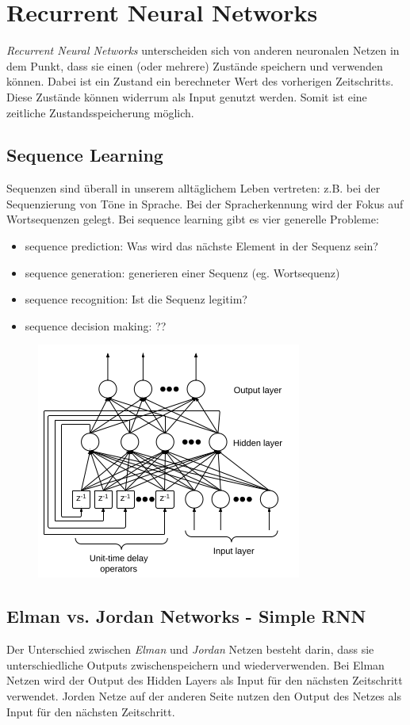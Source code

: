 \section{Recurrent Neural Networks}
\label{sect:recurrent-neural-networks}
\textit{Recurrent Neural Networks} unterscheiden sich von anderen neuronalen Netzen in dem Punkt, dass sie einen (oder mehrere) Zustände speichern und verwenden können. Dabei ist ein Zustand ein berechneter Wert des vorherigen Zeitschritts. Diese Zustände können widerrum als Input genutzt werden. Somit ist eine zeitliche Zustandsspeicherung möglich.

\subsection{Sequence Learning}
\label{ssect:sequence-learning}
Sequenzen sind überall in unserem alltäglichem Leben vertreten: z.B. bei der Sequenzierung von Töne in Sprache. Bei der Spracherkennung wird der Fokus auf Wortsequenzen gelegt. 
Bei sequence learning gibt es vier generelle Probleme:
\begin{itemize}
	\item sequence prediction: Was wird das nächste Element in der Sequenz sein?
	\item sequence generation: generieren einer Sequenz (eg. Wortsequenz)
	\item sequence recognition: Ist die Sequenz legitim?
	\item sequence decision making: ??
\end{itemize}
\begin{figure}[h]
\includegraphics[scale=1.0]{rnn-example1}
\end{figure}

\subsection{Elman vs. Jordan Networks - Simple RNN}
\label{ssect:elman-vs-jordan-networks-simple-rnn}
Der Unterschied zwischen \textit{Elman} und \textit{Jordan} Netzen besteht darin, dass sie unterschiedliche Outputs zwischenspeichern und wiederverwenden. Bei Elman Netzen wird der Output des Hidden Layers als Input für den nächsten Zeitschritt verwendet. Jorden Netze auf der anderen Seite nutzen den Output des Netzes als Input für den nächsten Zeitschritt.

